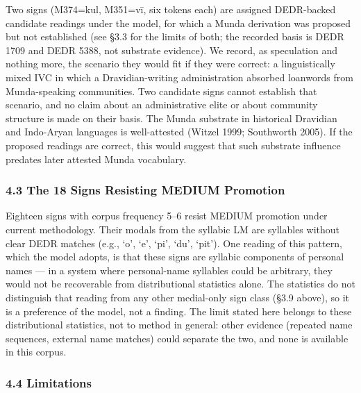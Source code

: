 \documentclass[
]{article}
\newcounter{none} %
\begin{document}
Two signs (M374=kul, M351=vī, six tokens each) are assigned DEDR-backed candidate readings under the model, for which a Munda derivation was proposed but not established (see §3.3 for the limits of both; the recorded basis is DEDR 1709 and DEDR 5388, not substrate evidence). We record, as speculation and nothing more, the scenario they would fit if they were correct: a linguistically mixed IVC in which a Dravidian-writing administration absorbed loanwords from Munda-speaking communities. Two candidate signs cannot establish that scenario, and no claim about an administrative elite or about community structure is made on their basis. The Munda substrate in historical
Dravidian and Indo-Aryan languages is well-attested (Witzel 1999;
Southworth 2005). If the proposed readings are correct, this would suggest that such substrate influence predates later attested Munda vocabulary.

\subsubsection{4.3 The 18 Signs Resisting MEDIUM Promotion}\label{the-18-signs-resisting-medium}

Eighteen signs with corpus frequency 5--6 resist MEDIUM promotion under current methodology. Their modals
from the syllabic LM are syllables without clear DEDR matches (e.g.,
`o', `e', `pi', `du', `pit'). One reading of this pattern, which the model adopts, is that these signs are syllabic components of personal names --- in a system where personal-name syllables could be arbitrary, they would not be recoverable from distributional statistics alone. The statistics do not distinguish that reading from any other medial-only sign class (§3.9 above), so it is a preference of the model, not a finding. The limit stated here belongs to these distributional statistics, not to method in general: other evidence (repeated name sequences, external name matches) could separate the two, and none is available in this corpus.

\subsubsection{4.4 Limitations}\label{limitations}
\end{document}
